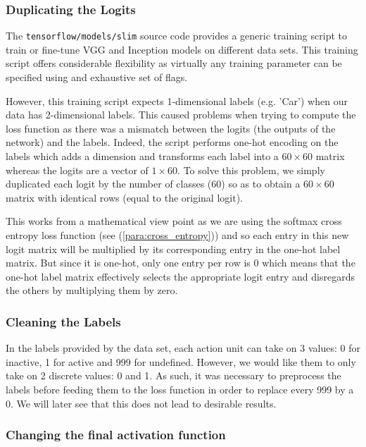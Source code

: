 \documentclass[12pt,twoside]{article}
\begin{document}
\subsubsection{Duplicating the Logits}

The \texttt{tensorflow/models/slim} source code provides a generic training
script to train or fine-tune VGG and Inception models on different data sets.
This training script offers considerable flexibility as virtually any training
parameter can be specified using and exhaustive set of flags.

However, this training script expects 1-dimensional labels (e.g. 'Car') when
our data has 2-dimensional labels. This caused problems when trying to compute
the loss function as there was a mismatch between the logits (the outputs of
the network) and the labels. Indeed, the script performs one-hot encoding on
the labels which adds a dimension and transforms each label into a
$60 \times 60$ matrix whereas the logits are a vector of $1 \times 60$. To
solve this problem, we simply duplicated each logit by the number of classes
(60) so as to obtain a $60 \times 60$ matrix with identical rows (equal to the
original logit). 

This works from a mathematical view point as we are using the softmax cross
entropy loss function (see (\ref{para:cross_entropy})) and so each entry in this new logit matrix will be
multiplied by its corresponding entry in the one-hot label matrix. But since it
is one-hot, only one entry per row is 0 which means that the one-hot label
matrix effectively selects the appropriate logit entry and disregards the
others by multiplying them by zero.

\subsubsection{Cleaning the Labels}\label{sec:cleaning}

In the labels provided by the data set, each action unit can take on 3 values:
0 for inactive, 1 for active and 999 for undefined. However, we would like them
to only take on 2 discrete values: 0 and 1. As such, it was necessary to
preprocess the labels before feeding them to the loss function in order to
replace every 999 by a 0. We will later see that this does not lead to
desirable results.

\subsubsection{Changing the final activation function}
\end{document}
